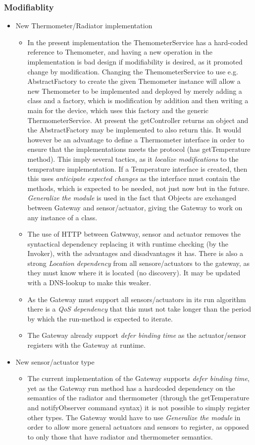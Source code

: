 \documentclass[a4paper,10pt]{article}
\begin{document}
\subsubsection{Modifiablity}
\begin{itemize}
\item New Thermometer/Radiator implementation
\begin{itemize}
\item In the present implementation the ThemometerService has a hard-coded reference to Themometer, and having a new operation in the implementation is bad design if modifiability is desired, as it promoted change by modification. Changing the ThemometerService to use e.g. AbstractFactory to create the given Themometer instance will allow a new Themometer to be implemented and deployed by merely adding a class and a factory, which is modification by addition and then writing a main for the device, which uses this factory and the generic ThermometerService. At present the getController returns an object and the AbstractFactory may be implemented to also return this. It would however be an advantage to define a Thermometer interface in order to ensure that the implementations meets the protocol (has getTemperature method). This imply several tactics, as it \emph{localize modifications} to the temperature implementation. If a Temperature interface is created, then this uses \emph{anticipate expected changes} as the interface must contain the methods, which is expected to be needed, not just now but in the future. \emph{Generalize the module} is used in the fact that Objects are exchanged between Gateway and sensor/actuator, giving the Gateway to work on any instance of a class. 
\item The use of HTTP between Gatwway, sensor and actuator removes the syntactical dependency replacing it with runtime checking (by the Invoker), with the advantages and disadvantages it has. There is also a strong \emph{Location dependency} from all sensore/actuators to the gateway, as they must know where it is located (no discovery). It may be updated with a DNS-lookup to make this weaker.
\item As the Gateway must support all sensors/actuators in its run algorithm there is a \emph{QoS dependency} that this must not take longer than the period by which the run-method is expected to iterate.
\item The Gateway already support \emph{defer binding time} as the actuator/sensor registers with the Gateway at runtime.
\end{itemize}
\item New sensor/actuator type
\begin{itemize}
\item The current implementation of the Gateway supports \emph{defer binding time}, yet as the Gateway run method has a hardcoded dependency on the semantics of the radiator and thermometer (through the getTemperature and notifyObserver command syntax) it is not possible to simply register other types. The Gateway would have to use \emph{Generalize the module} in order to allow more general actuators and sensors to register, as opposed to only those that have radiator and thermometer semantics.
\end{itemize}
\end{itemize}
\end{document}
